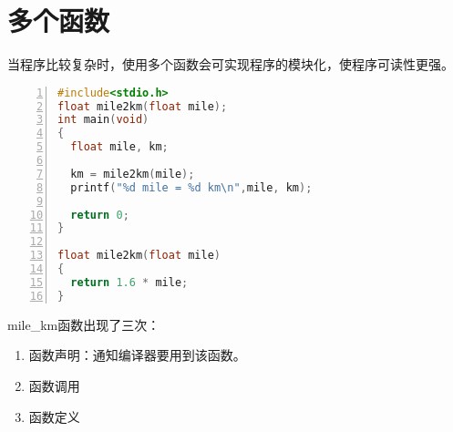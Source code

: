 \section{多个函数}
\begin{frame}[fragile]\ft{\secname}
  当程序比较复杂时，使用多个函数会可实现程序的模块化，使程序可读性更强。
\end{frame}

\begin{frame}\ft{\secname}
\begin{lstlisting}[language=c,numbers=left,frame=single]
#include<stdio.h>
float mile2km(float mile);
int main(void) 
{
  float mile, km;       
  
  km = mile2km(mile);
  printf("%d mile = %d km\n",mile, km); 
        
  return 0;
}

float mile2km(float mile)
{
  return 1.6 * mile;
}
\end{lstlisting}
\end{frame}

\begin{frame}[fragile]\ft{\secname}
mile\_km函数出现了三次：\vspace{0.1in}

\begin{enumerate}
\item 函数声明：通知编译器要用到该函数。\\[0.1in]
\item 函数调用\\[0.1in]
\item 函数定义
\end{enumerate}
\end{frame}
